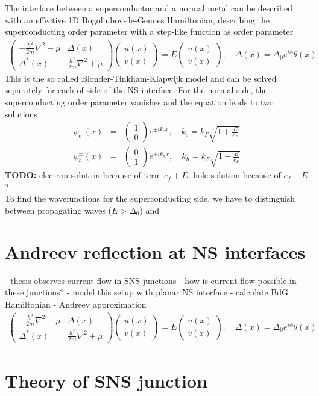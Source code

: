 The interface between a superconductor and a normal metal can be described with an effective 1D Bogoliubov-de-Gennes Hamiltonian, describing the superconducting order parameter with a step-like function as order parameter
\begin{eqnarray}
\begin{pmatrix}
-\frac{\hbar^2}{2m} \nabla^2 - \mu & \Delta(x) \\
\Delta^*(x) & \frac{\hbar^2}{2m} \nabla^2 + \mu
\end{pmatrix}
\begin{pmatrix}
u(x) \\
v(x)
\end{pmatrix} = E 
\begin{pmatrix}
u(x)\\
v(x)
\end{pmatrix}, \quad \Delta(x) = \Delta_0 e^{i \phi} \theta(x)
\end{eqnarray}
This is the so called Blonder-Tinkham-Klapwijk model and can be solved separately for each of side of the NS interface. For the normal side, the superconducting order parameter vanishes and the equation leads to two solutions
\begin{eqnarray}
\psi_e^{\pm}(x) &=& \begin{pmatrix} 1 \\ 0 \end{pmatrix} e^{\pm i k_e x}, \quad k_e = k_F \sqrt{1 + \frac{E}{e_F}}\\ 
\psi_h^{\pm}(x) &=& \begin{pmatrix} 0 \\ 1 \end{pmatrix} e^{\pm i k_h x}, \quad k_h =  k_F \sqrt{1 - \frac{E}{e_F}}
\end{eqnarray}
\textbf{TODO:} electron solution because of term $e_f + E$, hole solution because of $e_f - E$ ? \\
To find the wavefunctions for the superconducting side, we have to distinguish between propagating waves ($E > \Delta_0$) and 

\section{Andreev reflection at NS interfaces}

- thesis observes current flow in SNS junctions
- how is current flow possible in these junctions?
- model this setup with planar NS interface
- calculate BdG Hamiltonian
- Andreev approximation
\begin{eqnarray}
\begin{pmatrix}
-\frac{\hbar^2}{2m} \nabla^2 - \mu & \Delta(x) \\
\Delta^*(x) & \frac{\hbar^2}{2m} \nabla^2 + \mu
\end{pmatrix}
\begin{pmatrix}
u(x) \\
v(x)
\end{pmatrix} = E 
\begin{pmatrix}
u(x)\\
v(x)
\end{pmatrix}, \quad \Delta(x) = \Delta_0 e^{i \phi} \theta(x)
\end{eqnarray}
\section{Theory of SNS junction}